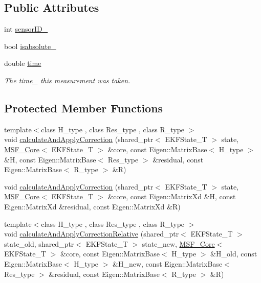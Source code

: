\subsection*{Public Attributes}
\begin{DoxyCompactItemize}
\item 
int \hyperlink{classmsf__core_1_1MSF__MeasurementBase_afad7c30029f47cea027415c04301dc48}{sensor\-I\-D\-\_\-}
\item 
bool \hyperlink{classmsf__core_1_1MSF__MeasurementBase_ad1ea7c4d392ecd3d894280283c04757a}{isabsolute\-\_\-}
\item 
double \hyperlink{classmsf__core_1_1MSF__MeasurementBase_a48b55b129f13afbed86db1b0543562db}{time}
\begin{DoxyCompactList}\small\item\em The time\-\_\- this measurement was taken. \end{DoxyCompactList}\end{DoxyCompactItemize}
\subsection*{Protected Member Functions}
\begin{DoxyCompactItemize}
\item 
{\footnotesize template$<$class H\-\_\-type , class Res\-\_\-type , class R\-\_\-type $>$ }\\void \hyperlink{classmsf__core_1_1MSF__MeasurementBase_a569c0772641a11d707349aab9dc0da7e}{calculate\-And\-Apply\-Correction} (shared\-\_\-ptr$<$ E\-K\-F\-State\-\_\-\-T $>$ state, \hyperlink{classmsf__core_1_1MSF__Core}{M\-S\-F\-\_\-\-Core}$<$ E\-K\-F\-State\-\_\-\-T $>$ \&core, const Eigen\-::\-Matrix\-Base$<$ H\-\_\-type $>$ \&H, const Eigen\-::\-Matrix\-Base$<$ Res\-\_\-type $>$ \&residual, const Eigen\-::\-Matrix\-Base$<$ R\-\_\-type $>$ \&R)
\item 
void \hyperlink{classmsf__core_1_1MSF__MeasurementBase_ade8ddcc9ef64571451560079381ecc64}{calculate\-And\-Apply\-Correction} (shared\-\_\-ptr$<$ E\-K\-F\-State\-\_\-\-T $>$ state, \hyperlink{classmsf__core_1_1MSF__Core}{M\-S\-F\-\_\-\-Core}$<$ E\-K\-F\-State\-\_\-\-T $>$ \&core, const Eigen\-::\-Matrix\-Xd \&H, const Eigen\-::\-Matrix\-Xd \&residual, const Eigen\-::\-Matrix\-Xd \&R)
\item 
{\footnotesize template$<$class H\-\_\-type , class Res\-\_\-type , class R\-\_\-type $>$ }\\void \hyperlink{classmsf__core_1_1MSF__MeasurementBase_a5b9db1020711ae6b5ba4e877dd03fa42}{calculate\-And\-Apply\-Correction\-Relative} (shared\-\_\-ptr$<$ E\-K\-F\-State\-\_\-\-T $>$ state\-\_\-old, shared\-\_\-ptr$<$ E\-K\-F\-State\-\_\-\-T $>$ state\-\_\-new, \hyperlink{classmsf__core_1_1MSF__Core}{M\-S\-F\-\_\-\-Core}$<$ E\-K\-F\-State\-\_\-\-T $>$ \&core, const Eigen\-::\-Matrix\-Base$<$ H\-\_\-type $>$ \&H\-\_\-old, const Eigen\-::\-Matrix\-Base$<$ H\-\_\-type $>$ \&H\-\_\-new, const Eigen\-::\-Matrix\-Base$<$ Res\-\_\-type $>$ \&residual, const Eigen\-::\-Matrix\-Base$<$ R\-\_\-type $>$ \&R)
\end{DoxyCompactItemize}


